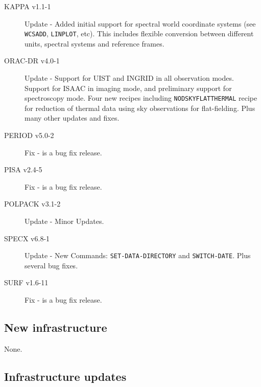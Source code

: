 \documentclass[twoside,11pt]{article}
\newcommand{\xlabel}[1]{}
\renewcommand{\_}{\texttt{\symbol{95}}}
\begin{document}
\begin{description}
\item[KAPPA v1.1-1]  Update - Added initial support for spectral world coordinate systems
(see \texttt{WCSADD}, \texttt{LINPLOT}, etc). This includes flexible conversion between different
units, spectral systems and reference frames.

\item[ORAC-DR v4.0-1] Update - Support for UIST and INGRID in all observation modes.
Support for ISAAC in imaging mode, and preliminary support for spectroscopy mode.
Four new recipes including \texttt{NOD\_SKY\_FLAT\_THERMAL} recipe for reduction of thermal data 
using sky observations for flat-fielding. Plus many other updates and fixes.

\item[PERIOD v5.0-2] Fix - is a bug fix release.
  
\item[PISA v2.4-5] Fix - is a bug fix release.

\item[POLPACK v3.1-2] Update - Minor Updates.

\item[SPECX v6.8-1] Update - New Commands: \texttt{SET-DATA-DIRECTORY} and \texttt{SWITCH-DATE}.
Plus several bug fixes. 

\item[SURF v1.6-11] Fix - is a bug fix release.

\end{description}

\subsection{\xlabel{new_infrastructure}New infrastructure}
\label{new_infrastructure}

None.





\subsection{\xlabel{infrastructure_updates}Infrastructure updates}
\label{infrastructure_updates}
\end{document}
